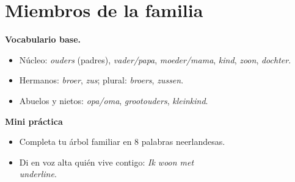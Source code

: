 \section{Miembros de la familia}
\textbf{Vocabulario base.}
\begin{itemize}[leftmargin=*]
  \item Núcleo: \textit{ouders} (padres), \textit{vader/papa}, \textit{moeder/mama}, \textit{kind}, \textit{zoon}, \textit{dochter}.
  \item Hermanos: \textit{broer}, \textit{zus}; plural: \textit{broers}, \textit{zussen}.
  \item Abuelos y nietos: \textit{opa/oma}, \textit{grootouders}, \textit{kleinkind}.
\end{itemize}

\textbf{Mini práctica}
\begin{itemize}[leftmargin=*]
  \item Completa tu árbol familiar en 8 palabras neerlandesas.
  \item Di en voz alta quién vive contigo: \textit{Ik woon met \\underline{\hspace{1.2cm}}}.
\end{itemize}

